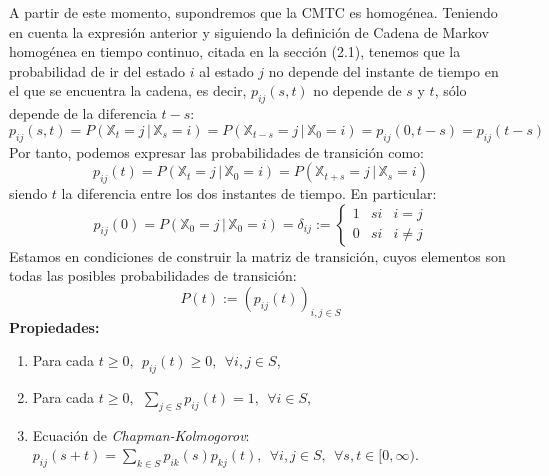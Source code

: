\documentclass[12pt,a4paper]{article}
\begin{document}
A partir de este momento, supondremos que la CMTC es homogénea. Teniendo en cuenta la expresión anterior y siguiendo la definición de Cadena de Markov homogénea en tiempo continuo, citada en la sección (2.1), tenemos que la probabilidad de ir del estado $i$ al estado $j$ no depende del instante de tiempo en el que se encuentra la cadena, es decir, $p_{ij}(s,t)$ no depende de $s$ y $t$, sólo depende de la diferencia $t-s$:
$$p_{ij}(s,t)=P(\mathbb{X}_t=j\, | \, \mathbb{X}_s=i)=P(\mathbb{X}_{t-s}=j\, | \, \mathbb{X}_0=i)=p_{ij}(0,t-s)=p_{ij}(t-s)$$
Por tanto, podemos expresar las probabilidades de transición como:
$$p_{ij}(t)=P(\mathbb{X}_t=j\, | \, \mathbb{X}_0=i)=P(\mathbb{X}_{t+s}=j\, | \, \mathbb{X}_s=i)$$
siendo $t$ la diferencia entre los dos instantes de tiempo. En particular:
$$p_{ij}(0)=P(\mathbb{X}_0=j\, | \, \mathbb{X}_0=i)=\delta_{ij}:= \left\{ \begin{array}{lcc}
   	   	             1 &   si  & i=j \\
   	   	             0 &  si & i\neq j
   	   	             \end{array} \right. $$
Estamos en condiciones de construir la matriz de transición, cuyos elementos son todas las posibles probabilidades de transición:
$$P(t):=(p_{ij}(t))_{i,j\in S}$$
\textbf{Propiedades:}
\begin{enumerate}
\item Para cada $t\geq 0, \ \ p_{ij}(t)\geq 0, \ \ \forall i,j\in S$,
\item Para cada $t\geq 0, \ \ \sum\limits_{j\in S}p_{ij}(t)=1, \ \ \forall i\in S$,
\item Ecuación de \textit{Chapman-Kolmogorov}: 
$p_{ij}(s+t)=\sum\limits_{k\in S}p_{ik}(s)p_{kj}(t), \ \ \forall i,j\in S, \ \ \forall s,t\in[0,\infty)$.
\end{enumerate}
\end{document}
